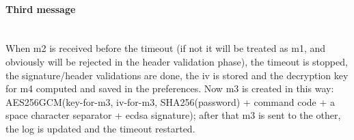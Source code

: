 \paragraph{Third message}\hspace{0pt}\\
When m2 is received before the timeout (if not it will be treated as m1, and obviously will be rejected in the header validation phase), the timeout is stopped, the signature/header validations are done, the iv is stored and the decryption key for m4 computed and saved in the preferences. Now m3 is created in this way: AES256GCM(key-for-m3, iv-for-m3, SHA256(password) + command code + a space character separator + ecdsa signature); after that m3 is sent to the other, the log is updated and the timeout restarted.